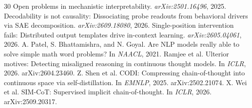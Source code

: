 \documentclass{article}
\begin{document}
\begin{thebibliography}{30}
 Open problems in mechanistic interpretability. \emph{arXiv:2501.16496}, 2025.
 Decodability is not causality: Dissociating probe readouts from behavioral drivers via SAE decomposition. \emph{arXiv:2609.18080}, 2026.
 Single-position intervention fails: Distributed output templates drive in-context learning. \emph{arXiv:2605.04061}, 2026.
 A. Patel, S. Bhattamishra, and N. Goyal. Are NLP models really able to solve simple math word problems? In \emph{NAACL}, 2021.
 Ramjee et al. Ulterior motives: Detecting misaligned reasoning in continuous thought models. In \emph{ICLR}, 2026. arXiv:2604.23460.
 Z. Shen et al. CODI: Compressing chain-of-thought into continuous space via self-distillation. In \emph{EMNLP}, 2025. arXiv:2502.21074.
 X. Wei et al. SIM-CoT: Supervised implicit chain-of-thought. In \emph{ICLR}, 2026. arXiv:2509.20317.
\end{thebibliography}
\end{document}
